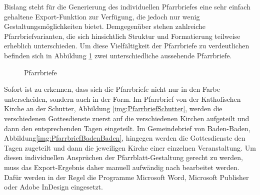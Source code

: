 Bislang steht für die Generierung des individuellen Pfarrbriefes eine sehr einfach gehaltene Export-Funktion zur Verfügung, die jedoch nur wenig Gestaltungsmöglichkeiten bietet. Demgegenüber stehen zahlreiche Pfarrbriefvarianten, die sich hinsichtlich Struktur und Formatierung teilweise erheblich unterschieden.
\abschnitt
Um diese Vielfältigkeit der Pfarrbriefe zu verdeutlichen befinden sich in Abbildung \ref{img:Gemeindebrief} zwei unterschiedliche aussehende Pfarrbriefe.\newline
\begin{figure}[h]
    \caption{Pfarrbriefe}
    \label{img:Gemeindebrief}
\end{figure}\newline
Sofort ist zu erkennen, dass sich die Pfarrbriefe nicht nur in den Farbe unterscheiden, sondern auch in der Form. Im Pfarrbrief von der Katholischen Kirche an der Schutter, Abbildung \ref{img:PfarrbriefSchutter}, werden die verschiedenen Gottesdienste zuerst auf die verschiedenen Kirchen aufgeteilt und dann den entsprechenden Tagen eingeteilt. Im Gemeindebrief von Baden-Baden, Abbildung\ref{img:PfarrbriefBadenBaden}, hingegen werden die Gottesdienste den Tagen zugeteilt und dann die jeweiligen Kirche einer einzelnen Veranstaltung.
\abschnitt
Um diesen individuellen Ansprüchen der Pfarrblatt-Gestaltung gerecht zu werden, muss das Export-Ergebnis daher manuell aufwändig nach bearbeitet werden. Dafür werden in der Regel die Programme Microsoft Word, Microsoft Publisher oder Adobe InDesign eingesetzt.
